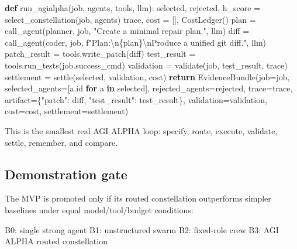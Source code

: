 \documentclass[11pt]{article}
\newenvironment{Shaded}{}{}
\newcommand{\BuiltInTok}[1]{\textcolor[rgb]{0.00,0.50,0.00}{#1}}
\newcommand{\CharTok}[1]{\textcolor[rgb]{0.25,0.44,0.63}{#1}}
\newcommand{\ControlFlowTok}[1]{\textcolor[rgb]{0.00,0.44,0.13}{\textbf{#1}}}
\newcommand{\KeywordTok}[1]{\textcolor[rgb]{0.00,0.44,0.13}{\textbf{#1}}}
\newcommand{\NormalTok}[1]{#1}
\newcommand{\OperatorTok}[1]{\textcolor[rgb]{0.40,0.40,0.40}{#1}}
\newcommand{\SpecialCharTok}[1]{\textcolor[rgb]{0.25,0.44,0.63}{#1}}
\newcommand{\SpecialStringTok}[1]{\textcolor[rgb]{0.73,0.40,0.53}{#1}}
\newcommand{\StringTok}[1]{\textcolor[rgb]{0.25,0.44,0.63}{#1}}
\begin{document}
\begin{Shaded}
\begin{Highlighting}[]
\KeywordTok{def}\NormalTok{ run\_agialpha(job, agents, tools, llm):}
\NormalTok{    selected, rejected, h\_score }\OperatorTok{=}\NormalTok{ select\_constellation(job, agents)}
\NormalTok{    trace, cost }\OperatorTok{=}\NormalTok{ [], CostLedger()}
\NormalTok{    plan }\OperatorTok{=}\NormalTok{ call\_agent(planner, job, }\StringTok{"Create a minimal repair plan."}\NormalTok{, llm)}
\NormalTok{    diff }\OperatorTok{=}\NormalTok{ call\_agent(coder, job, }\SpecialStringTok{f"Plan:}\CharTok{\textbackslash{}n}\SpecialCharTok{\{}\NormalTok{plan}\SpecialCharTok{\}}\CharTok{\textbackslash{}n}\SpecialStringTok{Produce a unified git diff."}\NormalTok{, llm)}
\NormalTok{    patch\_result }\OperatorTok{=}\NormalTok{ tools.write\_patch(diff)}
\NormalTok{    test\_result }\OperatorTok{=}\NormalTok{ tools.run\_tests(job.success\_cmd)}
\NormalTok{    validation }\OperatorTok{=}\NormalTok{ validate(job, test\_result, trace)}
\NormalTok{    settlement }\OperatorTok{=}\NormalTok{ settle(selected, validation, cost)}
    \ControlFlowTok{return}\NormalTok{ EvidenceBundle(job}\OperatorTok{=}\NormalTok{job, selected\_agents}\OperatorTok{=}\NormalTok{[a.}\BuiltInTok{id} \ControlFlowTok{for}\NormalTok{ a }\KeywordTok{in}\NormalTok{ selected],}
\NormalTok{                          rejected\_agents}\OperatorTok{=}\NormalTok{rejected, trace}\OperatorTok{=}\NormalTok{trace,}
\NormalTok{                          artifact}\OperatorTok{=}\NormalTok{\{}\StringTok{"patch"}\NormalTok{: diff, }\StringTok{"test\_result"}\NormalTok{: test\_result\},}
\NormalTok{                          validation}\OperatorTok{=}\NormalTok{validation, cost}\OperatorTok{=}\NormalTok{cost, settlement}\OperatorTok{=}\NormalTok{settlement)}
\end{Highlighting}
\end{Shaded}

This is the smallest real AGI ALPHA loop: specify, route, execute, validate, settle, remember, and compare.

\subsection{Demonstration gate}\label{demonstration-gate}

The MVP is promoted only if its routed constellation outperforms simpler baselines under equal model/tool/budget conditions:

\begin{Shaded}
\begin{Highlighting}[]
\NormalTok{B0: single strong agent}
\NormalTok{B1: unstructured swarm}
\NormalTok{B2: fixed{-}role crew}
\NormalTok{B3: AGI ALPHA routed constellation}
\end{Highlighting}
\end{Shaded}
\end{document}
